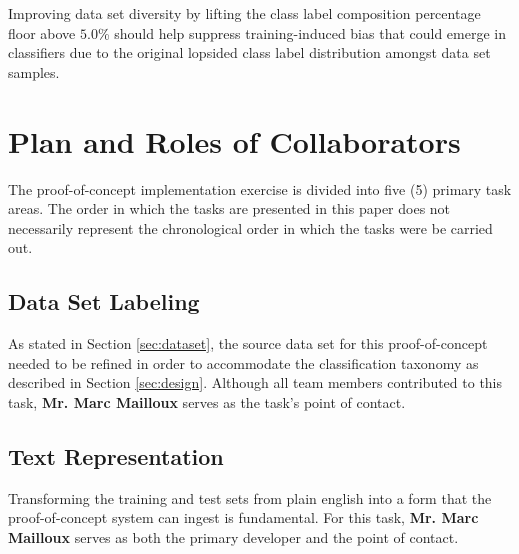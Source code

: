 \documentclass[conference]{sig-alternate-05-2015}
\begin{document}
Improving data set diversity by lifting the class label composition percentage
floor above $5.0$\% should help suppress training-induced bias that could emerge
in classifiers due to the original lopsided class label distribution amongst
data set samples.

\section{Plan and Roles of Collaborators}\label{sec:plan_roles}
The proof-of-concept implementation exercise is divided into five (5)
primary task areas. The order in which the tasks are presented in this paper
does not necessarily represent the chronological order in which the tasks were
be carried out.

\subsection{Data Set Labeling}\label{sec:labeling_task}
As stated in Section \ref{sec:dataset}, the source data set for this
proof-of-concept needed to be refined in order to accommodate the
classification taxonomy as described in Section \ref{sec:design}. Although all
team members contributed to this task, \textbf{Mr. Marc Mailloux} serves as the
task's point of contact.

\subsection{Text Representation}\label{sec:tokenization_task}
Transforming the training and test sets from plain english into a form that the
proof-of-concept system can ingest is fundamental. For this task,
\textbf{Mr. Marc Mailloux} serves as both the primary developer and the
point of contact.
\end{document}
